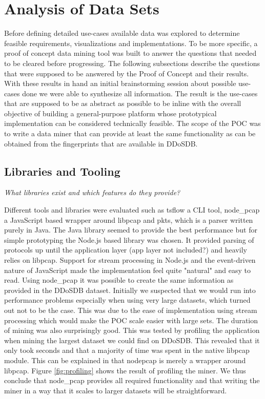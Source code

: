 \section{Analysis of Data Sets}
Before defining detailed use-cases available data was explored to determine feasible requirements, visualizations and implementations. To be more specific, a proof of concept data mining tool was built to answer the questions that needed to be cleared before progressing. The following subsections describe the questions that were supposed to be answered by the Proof of Concept and their results. With these results in hand an initial brainstorming session about possible use-cases done we were able to synthesize all information. The result is the use-cases that are supposed to be as abstract as possible to be inline with the overall objective of building a general-purpose platform whose prototypical implementation can be considered technically feasible.
The scope of the POC was to write a data miner that can provide at least the same functionality as can be obtained from the fingerprints that are available in DDoSDB.


\subsection{Libraries and Tooling}

\textit{What libraries exist and which features do they provide?}   

   Different tools and libraries were evaluated such as tsflow a CLI tool, node\_pcap a JavaScript based wrapper around libpcap and pkts, which is a parser written purely in Java.
    The Java library seemed to provide the best performance but for simple prototyping the Node.js based library was chosen. It provided parsing of protocols up until the application layer (app layer not included?) and heavily relies on libpcap. Support for stream processing in Node.js and the event-driven nature of JavaScript made the implementation feel quite "natural" and easy to read.
    Using node\_pcap it was possible to create the same information as provided in the DDoSDB dataset. Initially we suspected that we would run into performance problems especially when using very large datasets, which turned out not to be the case. This was due to the ease of implementation using stream processing which would make the POC scale easier with large sets. The duration of mining was also surprisingly good. This was tested by profiling the application when mining the largest dataset we could find on DDoSDB. This revealed that it only took seconds and that a majority of time was spent in the native libpcap module. This can be explained in that node\-pcap is merely a wrapper around libpcap. Figure \ref{fig:profiling} shows the result of profiling the miner. We thus conclude that node\_pcap provides all required functionality and that writing the miner in a way that it scales to larger datasets will be straightforward.
    
